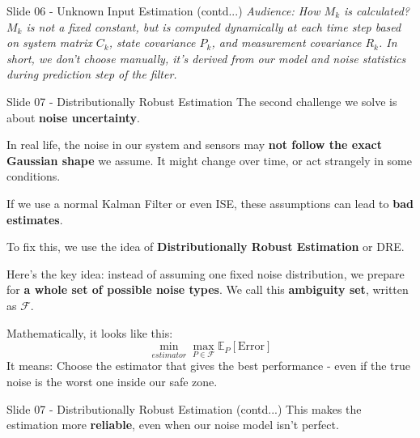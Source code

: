 \documentclass{beamer}
\begin{document}
\begin{frame}{Slide 06 - Unknown Input Estimation (contd...)}
\emph{Audience: How \(M_k\) is calculated? \(M_k\) is not a fixed
constant, but is computed dynamically at each time step based on system
matrix \(C_k\), state covariance \(P_k\), and measurement covariance
\(R_k\). In short, we don't choose manually, it's derived from our model
and noise statistics during prediction step of the filter.}
\end{frame}

\begin{frame}{Slide 07 - Distributionally Robust Estimation}
\protect\hypertarget{slide-07---distributionally-robust-estimation}{}
The second challenge we solve is about \textbf{noise uncertainty}.

In real life, the noise in our system and sensors may \textbf{not follow
the exact Gaussian shape} we assume. It might change over time, or act
strangely in some conditions.

If we use a normal Kalman Filter or even ISE, these assumptions can lead
to \textbf{bad estimates}.

To fix this, we use the idea of \textbf{Distributionally Robust
Estimation} or DRE.

Here's the key idea: instead of assuming one fixed noise distribution,
we prepare for \textbf{a whole set of possible noise types}. We call
this \textbf{ambiguity set}, written as \(\mathcal{F}\).

Mathematically, it looks like this:
\[\min_{estimator} \max_{P \in \mathcal{F}} \mathbb{E}_P[\text{Error}]\]
It means: Choose the estimator that gives the best performance - even if
the true noise is the worst one inside our safe zone.
\end{frame}

\begin{frame}{Slide 07 - Distributionally Robust Estimation (contd...)}
This makes the estimation more \textbf{reliable}, even when our noise
model isn't perfect.
\end{frame}
\end{document}
